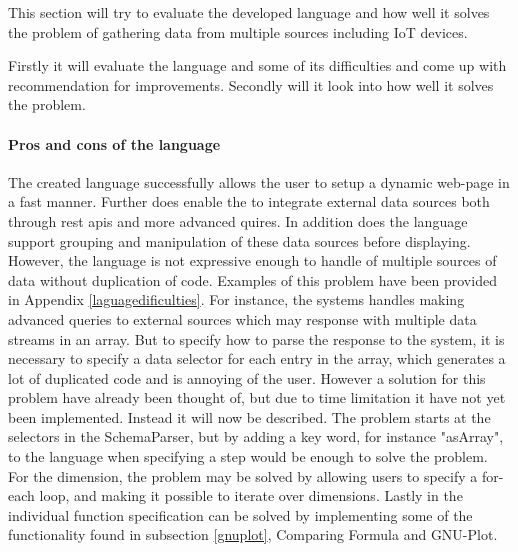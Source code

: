 This section will try to evaluate the developed language and how well it solves the problem of gathering data from multiple sources including IoT devices.

Firstly it will evaluate the language and some of its difficulties and come up with recommendation for improvements. 
Secondly will it look into how well it solves the problem.

\paragraph{Pros and cons of the language}
The created language successfully allows the user to setup a dynamic web-page in a fast manner. 
Further does enable the to integrate external data sources both through rest apis and more advanced quires.
In addition does the language support grouping and manipulation of these data sources before displaying. 
However, the language is not expressive enough to handle of multiple sources of data without duplication of code. 
Examples of this problem have been provided in Appendix \ref{laguagedificulties}.
For instance, the systems handles making advanced queries to external sources which may response with multiple data streams in an array. 
But to specify how to parse the response to the system, it is necessary to specify a data selector for each entry in the array, which generates a lot of duplicated code and is annoying of the user.
However a solution for this problem have already been thought of, but due to time limitation it have not yet been implemented. Instead it will now be described.
The problem starts at the selectors in the SchemaParser, but by adding a key word, for instance "asArray", to the language when specifying a step would be enough to solve the problem.
For the dimension, the problem may be solved by allowing users to specify a for-each loop, and making it possible to iterate over dimensions.
Lastly in the individual function specification can be solved by implementing some of the functionality found in subsection \ref{gnuplot}, Comparing Formula and GNU-Plot. 